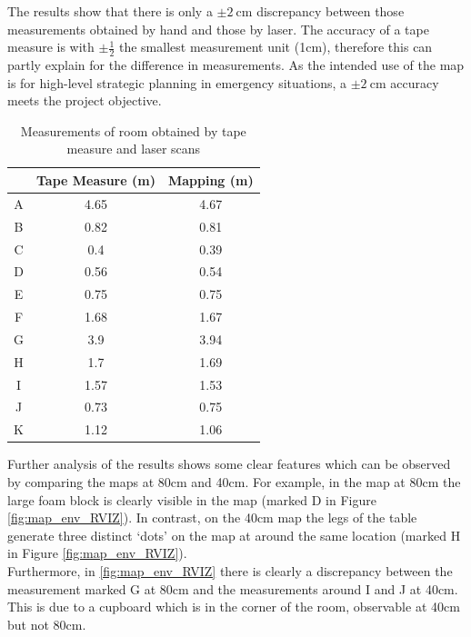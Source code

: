 \documentclass[capstone_report.tex]{subfiles}
\begin{document}
The results show that there is only a $\pm \SI{2}{\centi\metre}$ discrepancy between those measurements obtained by hand and those by laser.  The accuracy of a tape measure is with $\pm \frac{1}{2}$ the smallest measurement unit (1cm), therefore this can partly explain for the difference in measurements.  As the intended use of the map is for high-level strategic planning in emergency situations, a $\pm \SI{2}{\centi\metre}$ accuracy meets the project objective. \\

\begin{table}[H]
\centering
\begin{tabular}{@{}|ccc|@{}}
\toprule
&Tape Measure (m) & Mapping (m)       \\ \midrule
A            & 4.65    & 4.67 \\
B            & 0.82    & 0.81 \\
C            & 0.4     & 0.39 \\
D            & 0.56    & 0.54 \\
E            & 0.75    & 0.75 \\
F            & 1.68    & 1.67 \\
G            & 3.9     & 3.94 \\
H            & 1.7     & 1.69 \\
I            & 1.57    & 1.53 \\
J            & 0.73    & 0.75 \\
K            & 1.12    & 1.06 \\ \bottomrule
\end{tabular}
\caption{Measurements of room obtained by tape measure and laser scans}
\label{table:measure}
\end{table}

Further analysis of the results shows some clear features which can be observed by comparing the maps at 80cm and 40cm. For example, in the map at 80cm the large foam block is clearly visible in the map (marked D in Figure \ref{fig:map_env_RVIZ}). In contrast, on the 40cm map the legs of the table generate three distinct `dots' on the map at around the same location (marked H in Figure \ref{fig:map_env_RVIZ}).\\

Furthermore, in \ref{fig:map_env_RVIZ} there is clearly a discrepancy between the measurement marked G at 80cm and the measurements around I and J at 40cm. This is due to a cupboard which is in the corner of the room, observable at 40cm but not 80cm.\\
\end{document}
